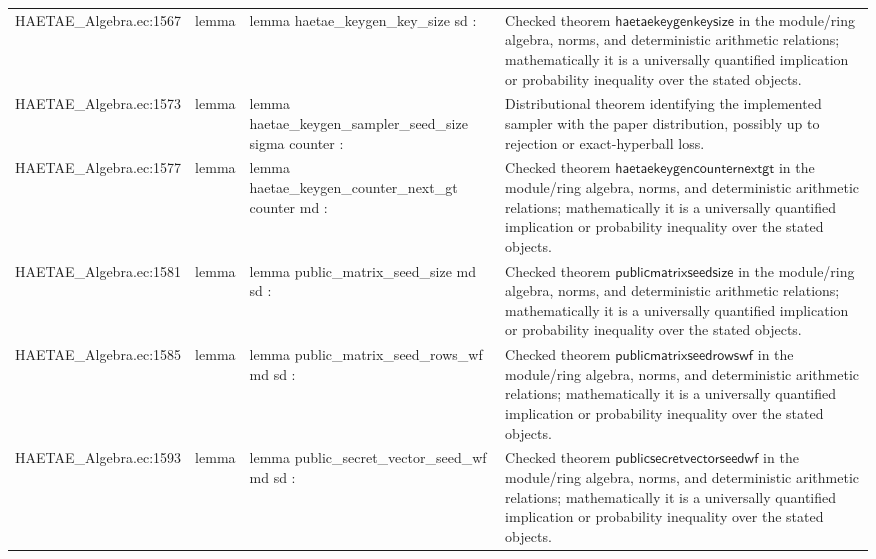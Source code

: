 \documentclass[10pt]{article}
\begin{document}
\begin{longtable}{L{0.11\textwidth}L{0.055\textwidth}L{0.385\textwidth}L{0.41\textwidth}}
HAETAE\_\allowbreak{}Algebra.\allowbreak{}ec:\allowbreak{}1567 & lemma & {\ttfamily\scriptsize lemma haetae\_\allowbreak{}keygen\_\allowbreak{}key\_\allowbreak{}size sd :} & Checked theorem $\mathsf{haetaekeygenkeysize}$ in the module/ring algebra, norms, and deterministic arithmetic relations; mathematically it is a universally quantified implication or probability inequality over the stated objects. \\
HAETAE\_\allowbreak{}Algebra.\allowbreak{}ec:\allowbreak{}1573 & lemma & {\ttfamily\scriptsize lemma haetae\_\allowbreak{}keygen\_\allowbreak{}sampler\_\allowbreak{}seed\_\allowbreak{}size sigma counter :} & Distributional theorem identifying the implemented sampler with the paper distribution, possibly up to rejection or exact-hyperball loss. \\
HAETAE\_\allowbreak{}Algebra.\allowbreak{}ec:\allowbreak{}1577 & lemma & {\ttfamily\scriptsize lemma haetae\_\allowbreak{}keygen\_\allowbreak{}counter\_\allowbreak{}next\_\allowbreak{}gt counter md :} & Checked theorem $\mathsf{haetaekeygencounternextgt}$ in the module/ring algebra, norms, and deterministic arithmetic relations; mathematically it is a universally quantified implication or probability inequality over the stated objects. \\
HAETAE\_\allowbreak{}Algebra.\allowbreak{}ec:\allowbreak{}1581 & lemma & {\ttfamily\scriptsize lemma public\_\allowbreak{}matrix\_\allowbreak{}seed\_\allowbreak{}size md sd :} & Checked theorem $\mathsf{publicmatrixseedsize}$ in the module/ring algebra, norms, and deterministic arithmetic relations; mathematically it is a universally quantified implication or probability inequality over the stated objects. \\
HAETAE\_\allowbreak{}Algebra.\allowbreak{}ec:\allowbreak{}1585 & lemma & {\ttfamily\scriptsize lemma public\_\allowbreak{}matrix\_\allowbreak{}seed\_\allowbreak{}rows\_\allowbreak{}wf md sd :} & Checked theorem $\mathsf{publicmatrixseedrowswf}$ in the module/ring algebra, norms, and deterministic arithmetic relations; mathematically it is a universally quantified implication or probability inequality over the stated objects. \\
HAETAE\_\allowbreak{}Algebra.\allowbreak{}ec:\allowbreak{}1593 & lemma & {\ttfamily\scriptsize lemma public\_\allowbreak{}secret\_\allowbreak{}vector\_\allowbreak{}seed\_\allowbreak{}wf md sd :} & Checked theorem $\mathsf{publicsecretvectorseedwf}$ in the module/ring algebra, norms, and deterministic arithmetic relations; mathematically it is a universally quantified implication or probability inequality over the stated objects. \\

\end{longtable}
\end{document}

